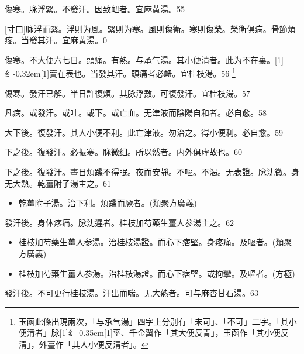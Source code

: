 \documentclass[11pt,oneside,b5paper]{ctexbook}
\begin{document}
\begin{flushleft}
傷寒。脉浮緊。不發汗。因致衄者。宜麻黄湯。55

[寸口]脉浮而緊。浮則为風。緊則为寒。風則傷衛。寒則傷榮。榮衛俱病。骨節煩疼。当發其汗。宜麻黄湯。0

傷寒。不大便六七日。頭痛。有熱。与承气湯。其小便清者。此为不在裏。{\hbox{\scalebox{0.6}[1]{纟}\kern-0.32em\scalebox{0.7}[1]{賣}}}在表也。当發其汗。頭痛者必衄。宜桂枝湯。56
\footnote{玉函此條出現兩次，「与承气湯」四字上分别有「未可」、「不可」二字。「其小便清者」脉{\hbox{\scalebox{0.68}[1]{纟}\kern-0.35em\scalebox{0.64}[1]{巠}}}、千金翼作「其大便反青」，玉函作「其小便反清」，外臺作「其人小便反清者」。}

傷寒。發汗已解。半日許復煩。其脉浮數。可復發汗。宜桂枝湯。57

凡病。或發汗。或吐。或下。或亡血。无津液而陰陽自和者。必自愈。58

大下後。復發汗。其人小便不利。此亡津液。勿治之。得小便利。必自愈。59

下之後。復發汗。必振寒。脉微细。所以然者。内外俱虛故也。60

下之後。復發汗。晝日煩躁不得眠。夜而安靜。不嘔。不渴。无表證。脉沈微。身无大熱。乾薑附子湯主之。61

\begin{itemize}
\item 乾薑附子湯。治下利。煩躁而厥者。(類聚方廣義)
\end{itemize}

發汗後。身体疼痛。脉沈遲者。桂枝加芍藥生薑人参湯主之。62

\begin{itemize}
\item 桂枝加芍藥生薑人参湯。治桂枝湯證。而心下痞堅。身疼痛。及嘔者。(類聚方廣義)
\item 桂枝加芍藥生薑人参湯。治桂枝湯證。而心下痞堅。或拘攣。及嘔者。(方極)
\end{itemize}

發汗後。不可更行桂枝湯。汗出而喘。无大熱者。可与麻杏甘石湯。63


\end{flushleft}
\end{document}
